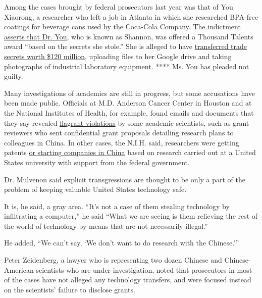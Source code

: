 Among the cases brought by federal prosecutors last year was that of You
Xiaorong, a researcher who left a job in Atlanta in which she researched
BPA-free coatings for beverage cans used by the Coca-Cola Company. The
indictment
\href{https://www.justice.gov/opa/pr/one-american-and-one-chinese-national-indicted-tennessee-conspiracy-commit-theft-trade}{asserts
that Dr. You}, who is known as Shannon, was offered a Thousand Talents
award ``based on the secrets she stole.'' She is alleged to have
\href{https://www.usnews.com/news/best-states/tennessee/articles/2019-12-23/feds-chemical-engineer-at-center-of-industrial-espionage}{transferred
trade secrets worth \$120 million}, uploading files to her Google drive
and taking photographs of industrial laboratory equipment. **** Ms. You
has pleaded not guilty.

Many investigations of academics are still in progress, but some
accusations have been made public. Officials at M.D. Anderson Cancer
Center in Houston and at the National Institutes of Health, for example,
found emails and documents that they say revealed
\href{https://www.nytimes3xbfgragh.onion/2019/11/04/health/china-nih-scientists.html?searchResultPosition=2}{flagrant
violations} by some academic scientists, such as grant reviewers who
sent confidential grant proposals detailing research plans to colleagues
in China. In other cases, the N.I.H. said, researchers were getting
patents
\href{https://www.justice.gov/opa/pr/couple-who-worked-local-research-institute-10-years-charged-stealing-trade-secrets-wire-fraud}{or
starting companies in China} based on research carried out at a United
States university with support from the federal government.

Dr. Mulvenon said explicit transgressions are thought to be only a part
of the problem of keeping valuable United States technology safe.

It is, he said, a gray area. ``It's not a case of them stealing
technology by infiltrating a computer,'' he said ``What we are seeing is
them relieving the rest of the world of technology by means that are not
necessarily illegal.''

He added, ``We can't say, `We don't want to do research with the
Chinese.'''

Peter Zeidenberg, a lawyer who is representing two dozen Chinese and
Chinese-American scientists who are under investigation, noted that
prosecutors in most of the cases have not alleged any technology
transfers, and were focused instead on the scientists' failure to
disclose grants.


